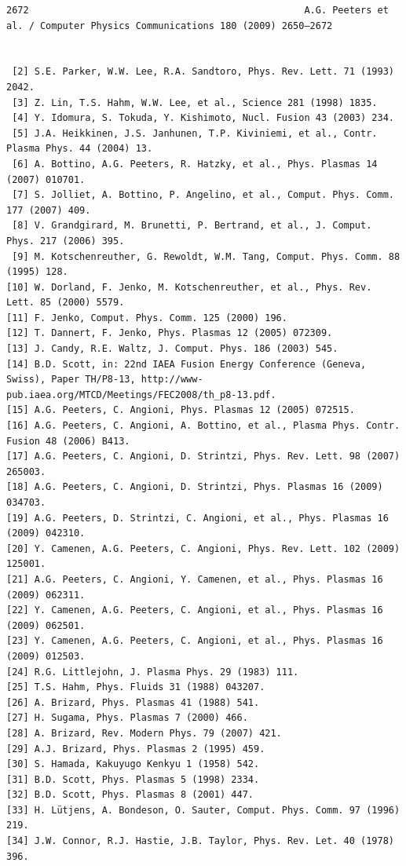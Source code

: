 \documentclass[a4paper]{article}
\newcommand{\gkwpagefont}{\fontsize{6.0pt}{7.55pt}\selectfont}
\begin{document}
\begin{Verbatim}[fontsize=\gkwpagefont]
2672                                                 A.G. Peeters et al. / Computer Physics Communications 180 (2009) 2650–2672


 [2] S.E. Parker, W.W. Lee, R.A. Sandtoro, Phys. Rev. Lett. 71 (1993) 2042.
 [3] Z. Lin, T.S. Hahm, W.W. Lee, et al., Science 281 (1998) 1835.
 [4] Y. Idomura, S. Tokuda, Y. Kishimoto, Nucl. Fusion 43 (2003) 234.
 [5] J.A. Heikkinen, J.S. Janhunen, T.P. Kiviniemi, et al., Contr. Plasma Phys. 44 (2004) 13.
 [6] A. Bottino, A.G. Peeters, R. Hatzky, et al., Phys. Plasmas 14 (2007) 010701.
 [7] S. Jolliet, A. Bottino, P. Angelino, et al., Comput. Phys. Comm. 177 (2007) 409.
 [8] V. Grandgirard, M. Brunetti, P. Bertrand, et al., J. Comput. Phys. 217 (2006) 395.
 [9] M. Kotschenreuther, G. Rewoldt, W.M. Tang, Comput. Phys. Comm. 88 (1995) 128.
[10] W. Dorland, F. Jenko, M. Kotschenreuther, et al., Phys. Rev. Lett. 85 (2000) 5579.
[11] F. Jenko, Comput. Phys. Comm. 125 (2000) 196.
[12] T. Dannert, F. Jenko, Phys. Plasmas 12 (2005) 072309.
[13] J. Candy, R.E. Waltz, J. Comput. Phys. 186 (2003) 545.
[14] B.D. Scott, in: 22nd IAEA Fusion Energy Conference (Geneva, Swiss), Paper TH/P8-13, http://www-pub.iaea.org/MTCD/Meetings/FEC2008/th_p8-13.pdf.
[15] A.G. Peeters, C. Angioni, Phys. Plasmas 12 (2005) 072515.
[16] A.G. Peeters, C. Angioni, A. Bottino, et al., Plasma Phys. Contr. Fusion 48 (2006) B413.
[17] A.G. Peeters, C. Angioni, D. Strintzi, Phys. Rev. Lett. 98 (2007) 265003.
[18] A.G. Peeters, C. Angioni, D. Strintzi, Phys. Plasmas 16 (2009) 034703.
[19] A.G. Peeters, D. Strintzi, C. Angioni, et al., Phys. Plasmas 16 (2009) 042310.
[20] Y. Camenen, A.G. Peeters, C. Angioni, Phys. Rev. Lett. 102 (2009) 125001.
[21] A.G. Peeters, C. Angioni, Y. Camenen, et al., Phys. Plasmas 16 (2009) 062311.
[22] Y. Camenen, A.G. Peeters, C. Angioni, et al., Phys. Plasmas 16 (2009) 062501.
[23] Y. Camenen, A.G. Peeters, C. Angioni, et al., Phys. Plasmas 16 (2009) 012503.
[24] R.G. Littlejohn, J. Plasma Phys. 29 (1983) 111.
[25] T.S. Hahm, Phys. Fluids 31 (1988) 043207.
[26] A. Brizard, Phys. Plasmas 41 (1988) 541.
[27] H. Sugama, Phys. Plasmas 7 (2000) 466.
[28] A. Brizard, Rev. Modern Phys. 79 (2007) 421.
[29] A.J. Brizard, Phys. Plasmas 2 (1995) 459.
[30] S. Hamada, Kakuyugo Kenkyu 1 (1958) 542.
[31] B.D. Scott, Phys. Plasmas 5 (1998) 2334.
[32] B.D. Scott, Phys. Plasmas 8 (2001) 447.
[33] H. Lütjens, A. Bondeson, O. Sauter, Comput. Phys. Comm. 97 (1996) 219.
[34] J.W. Connor, R.J. Hastie, J.B. Taylor, Phys. Rev. Let. 40 (1978) 396.

\end{Verbatim}
\end{document}
